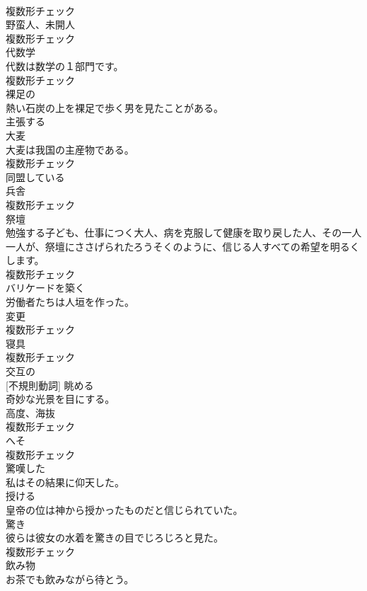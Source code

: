 \documentclass[8pt]{extreport}
\begin{document}
\begin{CJK}{UTF8}{min}
\\	複数形チェック
\\	[名詞]	野蛮人、未開人	
\\	複数形チェック
\\	[名詞]	代数学	
\\	代数は数学の１部門です。	
\\	複数形チェック
\\	[形容詞]	裸足の	
\\	熱い石炭の上を裸足で歩く男を見たことがある。	
\\	[動詞]	主張する	
\\	[名詞]	大⻨	
\\	大麦は我国の主産物である。	
\\	複数形チェック
\\	[形容詞]	同盟している	
\\	[名詞]	兵舎	
\\	複数形チェック
\\	[名詞]	祭壇	
\\	勉強する子ども、仕事につく大人、病を克服して健康を取り戻した人、その一人一人が、祭壇にささげられたろうそくのように、信じる人すべての希望を明るくします。	
\\	複数形チェック
\\	[動詞]	バリケードを築く	
\\	労働者たちは人垣を作った。	
\\	[名詞]	変更	
\\	複数形チェック
\\	[名詞]	寝具	
\\	複数形チェック
\\	[形容詞]	交互の	
\\	[動詞] [不規則動詞]	眺める	
\\	奇妙な光景を目にする。	
\\	[名詞]	高度、海抜	
\\	複数形チェック
\\	[名詞]	へそ	
\\	複数形チェック
\\	[形容詞]	驚嘆した	
\\	私はその結果に仰天した。	
\\	[動詞]	授ける	
\\	皇帝の位は神から授かったものだと信じられていた。	
\\	[名詞]	驚き	
\\	彼らは彼女の水着を驚きの目でじろじろと見た。	
\\	複数形チェック
\\	[名詞]	飲み物	
\\	お茶でも飲みながら待とう。	

\end{CJK}
\end{document}
